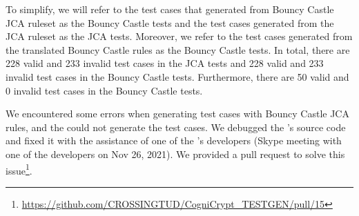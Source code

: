 To simplify, we will refer to the test cases that \cognicrypttestgen{} generated from \crysl{} Bouncy Castle JCA ruleset as the Bouncy Castle tests and the test cases generated from the JCA \crysl{} ruleset as the JCA tests. Moreover, we refer to the test cases generated from the translated Bouncy Castle \crysl{} rules as the \MARK{} Bouncy Castle tests. In total, there are 228 valid and 233 invalid test cases in the JCA tests and 228 valid and 233 invalid test cases in the Bouncy Castle tests. Furthermore, there are 50 valid and 0 invalid test cases in the Bouncy Castle \MARK{} tests.


We encountered some errors when generating test cases with Bouncy Castle JCA \crysl{} rules, and the \cognicrypttestgen{} could not generate the test cases. We debugged the \cognicrypttestgen's source code and fixed it with the assistance of one of the \cognicrypttestgen's developers (Skype meeting with one of the \cognicrypttestgen{} developers on Nov 26, 2021). We provided a pull request to solve this issue\footnote{\url{https://github.com/CROSSINGTUD/CogniCrypt\_TESTGEN/pull/15}}.



